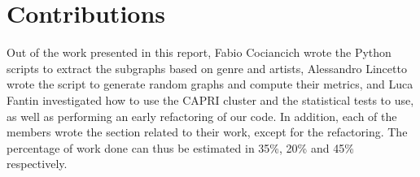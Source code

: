 \documentclass[a4paper, 12pt, conference]{ieeeconf}      %
\begin{document}
\section*{Contributions}

Out of the work presented in this report, Fabio Cociancich wrote the Python scripts to extract the subgraphs based on genre and artists, Alessandro Lincetto wrote the script to generate random graphs and compute their metrics, and Luca Fantin investigated how to use the CAPRI cluster and the statistical tests to use, as well as performing an early refactoring of our code. In addition, each of the members wrote the section related to their work, except for the refactoring. The percentage of work done can thus be estimated in 35\%, 20\% and 45\% respectively.



\printbibliography[nottype=online]
\end{document}
